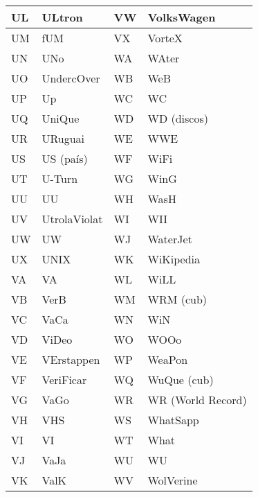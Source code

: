 \begin{table}[!ht]
    \centering
    \begin{tabular}{|l|l|l|l|}
    \hline
    UL & ULtron               & VW & VolksWagen        \\ \hline
    UM & fUM                  & VX & VorteX            \\ \hline
    UN & UNo                  & WA & WAter             \\ \hline
    UO & UndercOver           & WB & WeB               \\ \hline
    UP & Up                   & WC & WC                \\ \hline
    UQ & UniQue               & WD & WD (discos)       \\ \hline
    UR & URuguai              & WE & WWE               \\ \hline
    US & US (país)            & WF & WiFi              \\ \hline
    UT & U-Turn               & WG & WinG              \\ \hline
    UU & UU                   & WH & WasH              \\ \hline
    UV & UtrolaViolat         & WI & WII               \\ \hline
    UW & UW                   & WJ & WaterJet          \\ \hline
    UX & UNIX                 & WK & WiKipedia         \\ \hline
    VA & VA                   & WL & WiLL              \\ \hline
    VB & VerB                 & WM & WRM (cub)         \\ \hline
    VC & VaCa                 & WN & WiN               \\ \hline
    VD & ViDeo                & WO & WOOo              \\ \hline
    VE & VErstappen           & WP & WeaPon            \\ \hline
    VF & VeriFicar            & WQ & WuQue (cub)       \\ \hline
    VG & VaGo                 & WR & WR (World Record) \\ \hline
    VH & VHS                  & WS & WhatSapp          \\ \hline
    VI & VI                   & WT & What              \\ \hline
    VJ & VaJa                 & WU & WU                \\ \hline
    VK & ValK                 & WV & WolVerine         \\ \hline

\end{tabular}
\end{table}
